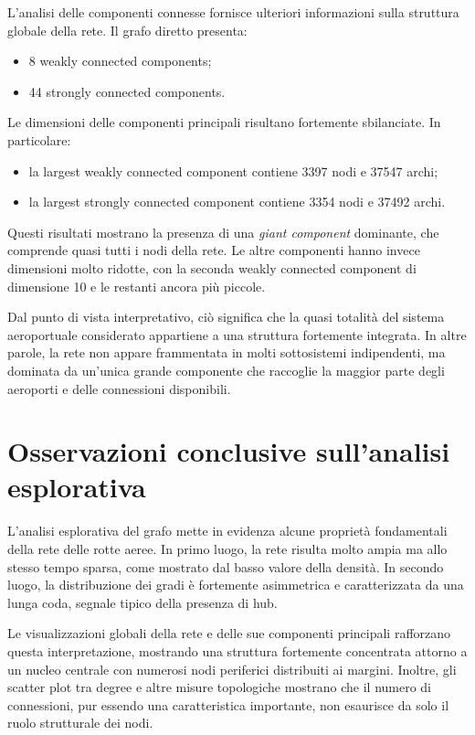 L’analisi delle componenti connesse fornisce ulteriori informazioni sulla struttura globale della rete. Il grafo diretto presenta:
\begin{itemize}
    \item 8 weakly connected components;
    \item 44 strongly connected components.
\end{itemize}

Le dimensioni delle componenti principali risultano fortemente sbilanciate. In particolare:
\begin{itemize}
    \item la largest weakly connected component contiene 3397 nodi e 37547 archi;
    \item la largest strongly connected component contiene 3354 nodi e 37492 archi.
\end{itemize}

Questi risultati mostrano la presenza di una \textit{giant component} dominante, che comprende quasi tutti i nodi della rete. Le altre componenti hanno invece dimensioni molto ridotte, con la seconda weakly connected component di dimensione 10 e le restanti ancora più piccole.

Dal punto di vista interpretativo, ciò significa che la quasi totalità del sistema aeroportuale considerato appartiene a una struttura fortemente integrata. In altre parole, la rete non appare frammentata in molti sottosistemi indipendenti, ma dominata da un’unica grande componente che raccoglie la maggior parte degli aeroporti e delle connessioni disponibili.

\section{Osservazioni conclusive sull’analisi esplorativa}

L’analisi esplorativa del grafo mette in evidenza alcune proprietà fondamentali della rete delle rotte aeree. In primo luogo, la rete risulta molto ampia ma allo stesso tempo sparsa, come mostrato dal basso valore della densità. In secondo luogo, la distribuzione dei gradi è fortemente asimmetrica e caratterizzata da una lunga coda, segnale tipico della presenza di hub.

Le visualizzazioni globali della rete e delle sue componenti principali rafforzano questa interpretazione, mostrando una struttura fortemente concentrata attorno a un nucleo centrale con numerosi nodi periferici distribuiti ai margini. Inoltre, gli scatter plot tra degree e altre misure topologiche mostrano che il numero di connessioni, pur essendo una caratteristica importante, non esaurisce da solo il ruolo strutturale dei nodi.

